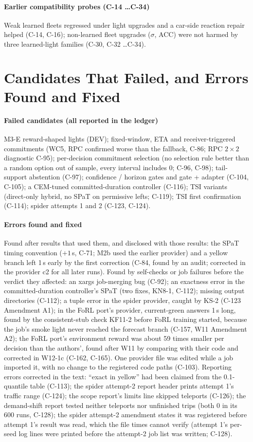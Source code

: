 \paragraph{Earlier compatibility probes (C-14 \dots C-34)} Weak learned fleets regressed under light upgrades and a car-side reaction repair
helped (C-14, C-16); non-learned fleet upgrades ($\sigma$, ACC) were not harmed by three learned-light families (C-30, C-32 \dots C-34).

\section{Candidates That Failed, and Errors Found and Fixed}\label{app:errors}
\paragraph{Failed candidates (all reported in the ledger)} M3-E reward-shaped lights (DEV); fixed-window, ETA and receiver-triggered
commitments (WC5, RPC confirmed worse than the fallback, C-86; RPC $2\times2$ diagnostic C-95); per-decision commitment selection (no
selection rule better than a random option out of sample, every interval includes 0; C-96, C-98); tail-support abstention (C-97);
confidence / horizon gates and gate + adapter (C-104, C-105); a CEM-tuned
committed-duration controller (C-116); TSI variants (direct-only hybrid, no SPaT on permissive lefts; C-119); TSI first confirmation
(C-114); spider attempts 1 and 2 (C-123, C-124).
\paragraph{Errors found and fixed} Found after results that used them, and disclosed with those results: the SPaT timing convention
($+1$\,s, C-71; M2b used the earlier provider) and a yellow branch left 1\,s early by the first correction (C-84, found by an audit;
corrected in the provider c2 for all later runs). Found by self-checks or job failures before the verdict they affected: an xargs job-merging bug (C-92); an exactness error in the committed-duration controller's SPaT (two fixes, KN8-1, C-112);
missing output directories (C-112); a tuple error in the spider provider, caught by KS-2 (C-123 Amendment A1); in the FoRL port's provider, current-green answers 1\,s long, found by the consistent-stub check KF11-2 before FoRL training started, because the job's smoke light never reached the forecast branch (C-157, W11 Amendment A2); the FoRL port's environment reward was
about 59 times smaller per decision than the authors', found after W11 by comparing with their code and corrected in W12-1c (C-162,
C-165). One provider file was edited
while a job imported it, with no change to the registered code paths (C-103).
Reporting errors corrected in the text: ``exact in yellow'' had been claimed from the 0.1-quantile table (C-113); the spider attempt-2
report header prints attempt 1's traffic range (C-124); the scope report's limits line skipped teleports (C-126); the demand-shift report tested neither teleports nor unfinished trips (both 0
in its 600 runs, C-128); the spider attempt-2 amendment states it was registered before attempt 1's result was read, which the file
times cannot verify (attempt 1's per-seed log lines were printed before the attempt-2 job list was written; C-128).
